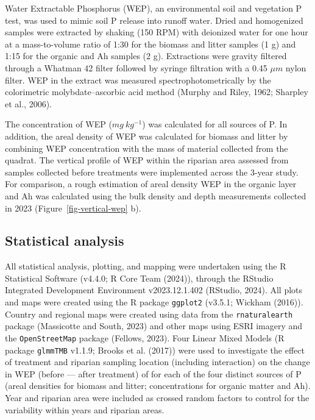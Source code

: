 \documentclass[
]{agujournal2019}
\begin{document}
Water Extractable Phosphorus (WEP), an environmental soil and vegetation
P test, was used to mimic soil P release into runoff water. Dried and
homogenized samples were extracted by shaking (150 RPM) with deionized
water for one hour at a mass-to-volume ratio of 1:30 for the biomass and
litter samples (1 g) and 1:15 for the organic and Ah samples (2 g).
Extractions were gravity filtered through a Whatman 42 filter followed
by syringe filtration with a 0.45 \(\mu m\) nylon filter. WEP in the
extract was measured spectrophotometrically by the colorimetric
molybdate--ascorbic acid method (Murphy and Riley, 1962; Sharpley et
al., 2006).

The concentration of WEP (\(mg~kg^{-1}\)) was calculated for all sources
of P. In addition, the areal density of WEP was calculated for biomass
and litter by combining WEP concentration with the mass of material
collected from the quadrat. The vertical profile of WEP within the
riparian area assessed from samples collected before treatments were
implemented across the 3-year study. For comparison, a rough estimation
of areal density WEP in the organic layer and Ah was calculated using
the bulk density and depth measurements collected in 2023
(Figure~\ref{fig-vertical-wep} b).

\subsection{Statistical analysis}\label{statistical-analysis}

All statistical analysis, plotting, and mapping were undertaken using
the R Statistical Software (v4.4.0; R Core Team (2024)), through the
RStudio Integrated Development Environment v2023.12.1.402 (RStudio,
2024). All plots and maps were created using the R package
\texttt{ggplot2} (v3.5.1; Wickham (2016)). Country and regional maps
were created using data from the \texttt{rnaturalearth} package
(Massicotte and South, 2023) and other maps using ESRI imagery and the
\texttt{OpenStreetMap} package (Fellows, 2023). Four Linear Mixed Models
(R package \texttt{glmmTMB} v1.1.9; Brooks et al. (2017)) were used to
investigate the effect of treatment and riparian sampling location
(including interaction) on the change in WEP (before --- after
treatment) of for each of the four distinct sources of P (areal
densities for biomass and litter; concentrations for organic matter and
Ah). Year and riparian area were included as crossed random factors to
control for the variability within years and riparian areas.
\end{document}

